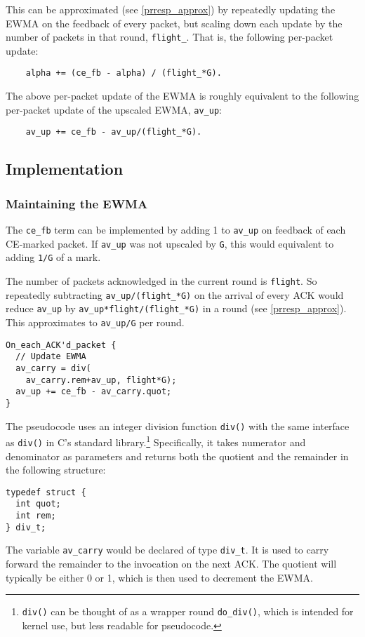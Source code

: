 This can be approximated (see \autoref{prresp_approx}) by repeatedly updating
the EWMA on the feedback of every packet, but scaling down each update by the
number of packets in that round, \texttt{flight\_}. That is, the following
per-packet update:
\begin{verbatim}
    alpha += (ce_fb - alpha) / (flight_*G).
\end{verbatim}

The above per-packet update of the EWMA is roughly equivalent to the following
per-packet update of the upscaled EWMA, \texttt{av\_up}:
\begin{verbatim}
    av_up += ce_fb - av_up/(flight_*G).
\end{verbatim}

\subsection{Implementation}\label{prresp_implementation}

\subsubsection{Maintaining the EWMA}

The \texttt{ce\_fb} term can be implemented by adding 1 to \texttt{av\_up} on
feedback of each CE-marked packet. If \texttt{av\_up} was not upscaled by
\texttt{G}, this would equivalent to adding \texttt{1/G} of a mark.

The number of packets acknowledged in the current round is \texttt{flight}. So
repeatedly subtracting \texttt{av\_up/(flight\_*G)} on the arrival of every ACK
would reduce \texttt{av\_up} by \texttt{av\_up*flight/(flight\_*G)} in a round
(see \autoref{prresp_approx}). This approximates to \texttt{av\_up/G} per round.

\begin{verbatim}
On_each_ACK'd_packet {
  // Update EWMA
  av_carry = div(
    av_carry.rem+av_up, flight*G);
  av_up += ce_fb - av_carry.quot;
}
\end{verbatim}

The pseudocode uses an integer division function \texttt{div()} with the same
interface as \texttt{div()} in C's standard library.\footnote{\texttt{div()} can
be thought of as a wrapper round \texttt{do\_div()}, which is intended for
kernel use, but less readable for pseudocode.} Specifically, it takes numerator
and denominator as parameters and returns both the
quotient and the remainder in the following structure:
\begin{verbatim}
typedef struct {
  int quot;
  int rem;
} div_t;
\end{verbatim}
The variable \texttt{av\_carry} would be declared of type \texttt{div\_t}. It is
used to carry forward the remainder to the invocation on the next ACK. The
quotient will typically be either 0 or 1, which is then used to decrement the
EWMA.

